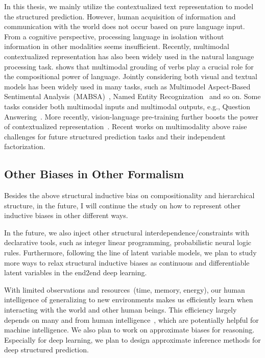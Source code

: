  In this thesis,
we mainly utilize the contextualized text representation to model the
structured prediction. However, human acquisition of information and
communication with the world does not occur based on pure language
input. From a cognitive perspective, processing language in isolation
without information in other modalities seems insufficient. Recently,
multimodal contextualized representation has also been widely used in
the natural language processing
task. \citet{beinborn-etal-2018-multimodal} shows that multimodal
grouding of verbs play a crucial role for the compositional power of
language. Jointly considering both visual and textual models has been
widely used in many tasks, such as Multimodel Aspect-Based Sentimental
Analysis~(MABSA)~\cite{ju2021joint}, Named Entity
Recognization~\cite{zhang2021multi} and so on. Some tasks consider
both multimodal inputs and multimodal outputs, e.g., Question
Answering~\cite{singh-etal-2021-mimoqa}. More recently,
vision-language pre-training further boosts the power of contextualized
representation~\cite{lu2019vilbert,ling-etal-2022-vision}. Recent works on multimodality above raise challenges for future
structured prediction tasks and their independent factorization.

\subsection{Other Biases in Other Formalism}
\label{ssec:future:rep-bias-ways}

Besides the above structural inductive bias on compositionality and
hierarchical structure, in the future, I will continue the study on how
to represent other inductive biases in other different ways.

In the
future, we also inject other structural interdependence/constraints
with declarative tools, such as integer linear programming,
probabilistic neural logic rules. Furthermore, following the line of
latent variable models, we plan to study more ways to relax structural
inductive biases as continuous and differentiable latent variables in
the end2end deep learning.

 With limited observations and
resources~(time, memory, energy), our human intelligence of
generalizing to new environments makes us efficiently learn when
interacting with the world and other human beings. This efficiency
largely depends on many  and  from human intelligence~\cite{Gershman2021WhatMU}, which are
potentially helpful for machine intelligence. We also plan to work
on approximate biases for reasoning. Especially for deep learning, we
plan to design approximate inference methods for deep structured
prediction.

